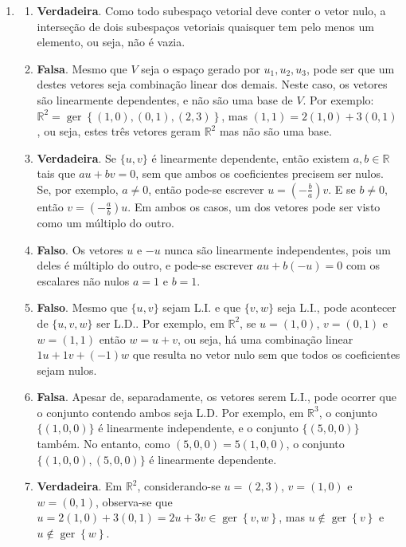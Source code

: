 \documentclass[12pt,a4paper]{article}
\newcommand*\ger[1]{\operatorname{ger}\left\{#1\right\}}
\newcommand*\R{\mathbb{R}}
\begin{document}
\begin{enumerate}
\item 
\begin{enumerate}
\item \textbf{Verdadeira}. Como todo subespaço vetorial deve conter o vetor nulo, a interseção de dois subespaços vetoriais quaisquer tem pelo menos um elemento, ou seja, não é vazia.
\item \textbf{Falsa}. Mesmo que $V$ seja o espaço gerado por ${ u_1, u_2, u_3 }$, pode ser que um destes vetores seja combinação linear dos demais. Neste caso, os vetores são linearmente dependentes, e não são uma base de $V$. Por exemplo: $\R^2 = \ger{(1,0),(0,1),(2,3)}$, mas $(1,1) = 2(1,0)+3(0,1)$, ou seja, estes três vetores geram $\R^2$ mas não são uma base.
\item \textbf{Verdadeira}. Se $\{u, v\}$ é linearmente dependente, então existem $a,b \in \R$ tais que $au+bv = 0$, sem que ambos os coeficientes precisem ser nulos. Se, por exemplo, $a \neq 0$, então pode-se escrever $u = (-\frac{b}{a}) v$. E se $b \neq 0$, então $v = (-\frac{a}{b}) u$. Em ambos os casos, um dos vetores pode ser visto como um múltiplo do outro.

\item \textbf{Falso}. Os vetores $u$ e $-u$ nunca são linearmente independentes, pois um deles é múltiplo do outro, e pode-se escrever $au + b(-u) = 0$ com os escalares não nulos $a=1$ e $b=1$.

\item \textbf{Falso}. Mesmo que $\{u, v\}$ sejam L.I. e que $\{ v, w \}$ seja L.I., pode acontecer de $\{u, v, w \}$ ser L.D.. Por exemplo, em $\R^2$, se $u = (1,0)$, $v = (0,1)$ e $w = (1, 1)$ então $w = u + v$, ou seja, há uma combinação linear $1u+1v+(-1)w$ que resulta no vetor nulo sem que todos os coeficientes sejam nulos.
\item \textbf{Falsa}. Apesar de, separadamente, os vetores serem L.I., pode ocorrer que o conjunto contendo ambos seja L.D. Por exemplo, em $\R^3$, o conjunto $\{ (1,0,0) \}$ é linearmente independente, e o conjunto $\{ (5,0,0) \}$ também. No entanto, como $(5,0,0) = 5 (1,0,0)$, o conjunto $\{ (1,0,0), (5,0,0) \}$ é linearmente dependente.
\item \textbf{Verdadeira}. Em $\R^2$, considerando-se $u=(2,3)$, $v = (1,0)$ e $w = (0,1)$, observa-se que $u = 2(1,0)+3(0,1) = 2u+3v \in \ger{v,w}$, mas $u \not \in \ger{v}$ e $u \not \in \ger{w}$.
\end{enumerate}


\end{enumerate}
\end{document}
